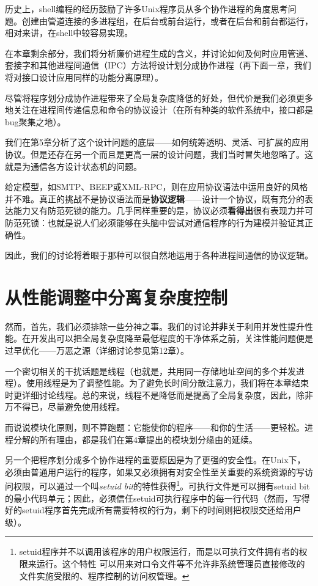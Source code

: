 \documentclass[12pt,oneside]{book}
\begin{document}
\begin{common-format}
历史上，shell编程的经历鼓励了许多Unix程序员从多个协作进程的角度思考问题。创建由管道连接的多进程组，在后台或前台运行，或者在后台和前台都运行，相对来讲，在shell中较容易实现。

在本章剩余部分，我们将分析廉价进程生成的含义，并讨论如何及何时应用管道、套接字和其他进程间通信（IPC）方法将设计划分成协作进程（再下面一章，我们将对接口设计应用同样的功能分离原理）。

尽管将程序划分成协作进程带来了全局复杂度降低的好处，但代价是我们必须更多地关注在进程间传递信息和命令的协议设计（在所有种类的软件系统中，接口都是bug聚集之地）。

我们在第5章分析了这个设计问题的底层——如何统筹透明、灵活、可扩展的应用协议。但是还存在另一个而且是更高一层的设计问题，我们当时冒失地忽略了。这就是为通信各方设计状态机的问题。

给定模型，如SMTP、BEEP或XML-RPC，则在应用协议语法中运用良好的风格并不难。真正的挑战不是协议语法而是\textbf{协议逻辑}——设计一个协议，既有充分的表达能力又有防范死锁的能力。几乎同样重要的是，协议必须\textbf{看得出}很有表现力并可防范死锁：也就是说人们必须能够在头脑中尝试对通信程序的行为建模并验证其正确性。

因此，我们的讨论将着眼于那种可以很自然地运用于各种进程间通信的协议逻辑。

\section{从性能调整中分离复杂度控制}
然而，首先，我们必须排除一些分神之事。我们的讨论\textbf{并非}关于利用并发性提升性能。在开发出可以把全局复杂度降至最低程度的干净体系之前，关注性能问题便是过早优化——万恶之源（详细讨论参见第12章）。

一个密切相关的干扰话题是线程（也就是，共用同一存储地址空间的多个并发进程）。使用线程是为了调整性能。为了避免长时间分散注意力，我们将在本章结束时更详细讨论线程。总的来说，线程不是降低而是提高了全局复杂度，因此，除非万不得已，尽量避免使用线程。

而说说模块化原则，则不算跑题：它能使你的程序——和你的生活——更轻松。进程分解的所有理由，都是我们在第4章提出的模块划分缘由的延续。

另一个把程序划分成多个协作进程的重要原因是为了更强的安全性。在Unix下，必须由普通用户运行的程序，如果又必须拥有对安全性至关重要的系统资源的写访问权限，可以通过一个叫\textit{setuid bit}的特性获得\footnote{setuid程序并不以调用该程序的用户权限运行，而是以可执行文件拥有者的权限来运行。这个特性
可以用来对口令文件等不允许非系统管理员直接修改的文件实施受限的、程序控制的访问权管理。}。可执行文件是可以拥有setuid bit的最小代码单元；因此，必须信任setuid可执行程序中的每一行代码（然而，写得好的setuid程序首先完成所有需要特权的行为，剩下的时间则把权限交还给用户级）。


\end{common-format}
\end{document}
